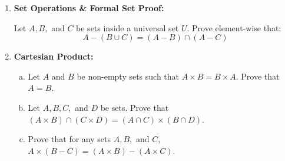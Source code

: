 \documentclass[12pt]{article}
\begin{document}
\begin{enumerate}[1.]
\begin{enumerate}[a.]
            $$1 \cdot 2 + 2 \cdot 3 + 3 \cdot 4 + \dots + n(n+1) = \frac{n(n+1)(n+2)}{3}$$
        \end{enumerate}
    

    \item{\textbf{Set Operations \& Formal Set Proof:}}

    Let $A, B,$ and $C$ be sets inside a universal set $U$. Prove element-wise that:
    \[A - (B \cup C) = (A - B) \cap (A - C)\]

    \item{\textbf{Cartesian Product:}}
    \begin{enumerate}[a.]
    \vspace{-0.5em}
        \item{Let $A$ and $B$ be non-empty sets such that $A \times B = B \times A$. Prove that $A = B$.}
        \item{Let $A, B, C,$ and $D$ be sets. Prove that $(A \times B) \cap (C \times D) = (A \cap C) \times (B \cap D)$.}
        \item{Prove that for any sets $A, B,$ and $C$, $A \times (B - C) = (A \times B) - (A \times C)$.}
    \end{enumerate}
    
\end{enumerate}
\begin{center}
\end{center}

\end{document}
